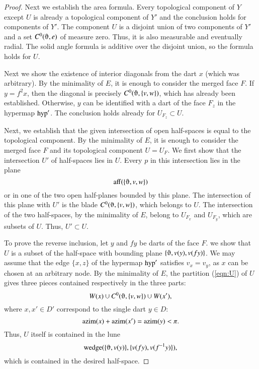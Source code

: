 \begin{proof}
Next we establish the area formula.  Every topological component of $Y$ 
except $U$ is already a topological component of $Y'$ and the conclusion
holds for components of $Y'$.  The component $U$ is a disjoint union of two
components of $Y'$ and a set $C^0(\orgn,e)$ of measure zero.  Thus, it
is also measurable and eventually radial.  The solid angle formula is
additive over the disjoint union, so the formula holds for $U$.

Next we show the existence of interior diagonals from the dart $x$ (which was arbitrary).  By the minimality of $E$, it is enough to consider the merged face $F$.  
If $y=f^2x$, then the diagonal is precisely $C^0(\orgn,\{v,w\})$,
which has already been established.  Otherwise, $y$ can be identified with
a dart of the face $F_z$ in the hypermap ${\operatorname{hyp}}'$.  The conclusion holds
already for $U_{F_z}\subset U$.  


Next, we establish that the given intersection of open half-spaces is equal
to the topological component. By the minimality of $E$, it is enough to consider
the merged face $F$ and its topological component $U=U_F$.
We first show that the intersection $U'$ of half-spaces lies in $U$.
Every $p$ in this intersection lies in the plane
$$
\op{aff}(\{\orgn,v,w\})
$$
or in one of the two open half-planes bounded by this plane.  The intersection
of this plane with $U'$ is the blade $C^0(\orgn,\{v,w\})$, which belongs
to $U$. The intersection of the two half-spaces, by the minimality of $E$,
belong to $U_{F_x}$ and $U_{F_y}$, which are subsets of $U$.  Thus, $U'\subset U$.

To prove the reverse inclusion, let $y$ and $f y$ be darts of
the face $F$.  we show that $U$ is a subset of the half-space with bounding
plane $\{\orgn,v(y),v(f y)\}$.  We may assume that the edge $\{x,z\}$ of the
hypermap ${\operatorname{hyp}}'$ satisfies $v_x = v_y$, as $x$ can be chosen at an
arbitrary node.  By the minimality of $E$,  
the partition (\ref{eqn:U}) of $U$ gives three pieces
contained respectively in the three parts:
$$
W(x) \cup C^0(\orgn,\{v,w\}) \cup W(x'),
$$
where $x,x'\in D'$ correspond to the single dart $y\in D$:
$$
{\operatorname{azim}}(x) + {\operatorname{azim}}(x') = {\operatorname{azim}}(y) < \pi.
$$
Thus, $U$ itself is contained in the lune
$$
\op{wedge}(\{\orgn,v(y)\},\{v(f y),v(f^{-1} y)\}),
$$
which is contained in the desired half-space.
\end{proof}

